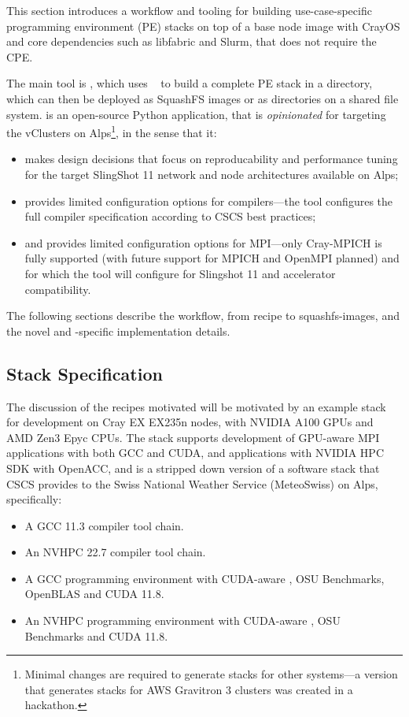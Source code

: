 This section introduces a workflow and tooling for building use-case-specific programming environment (PE) stacks on top of a base node image with CrayOS and core dependencies such as libfabric and Slurm, that does not require the CPE.

The main tool is \href{https://github.com/eth-cscs/stackinator}{\stackinator}, which uses \spack~\cite{gamblin:sc15} to build a complete PE stack in a directory, which can then be deployed as SquashFS images or as directories on a shared file system.
\stackinator is an open-source Python application, that is \emph{opinionated} for targeting the vClusters on Alps\footnote{Minimal changes are required to generate stacks for other systems---a version that generates stacks for AWS Gravitron 3 clusters was created in a hackathon.}, in the sense that it:
\begin{itemize}
    \item makes design decisions that focus on reproducability and performance tuning for the target SlingShot 11 network and node architectures available on Alps;
    \item provides limited configuration options for compilers---the tool configures the full compiler specification according to CSCS best practices;
    \item and provides limited configuration options for MPI---only Cray-MPICH is fully supported (with future support for MPICH and OpenMPI planned) and for which the tool will configure for Slingshot 11 and accelerator compatibility.
\end{itemize}

The following sections describe the workflow, from recipe to squashfs-images, and the novel and \crayex-specific implementation details.

\subsection{Stack Specification}

The discussion of the \spack recipes motivated will be motivated by an example stack for development on Cray EX EX235n nodes, with NVIDIA A100 GPUs and AMD Zen3 Epyc CPUs.
The stack supports development of GPU-aware MPI applications with both GCC and CUDA, and applications with NVIDIA HPC SDK with OpenACC, and is a stripped down version of a software stack that CSCS provides to the Swiss National Weather Service (MeteoSwiss) on Alps, specifically:
\begin{itemize}
    \item A GCC 11.3 compiler tool chain.
    \item An NVHPC 22.7 compiler tool chain.
    \item A GCC programming environment  with CUDA-aware \craympich, OSU Benchmarks, OpenBLAS and CUDA 11.8.
    \item An NVHPC programming environment  with CUDA-aware \craympich, OSU Benchmarks and CUDA 11.8.
\end{itemize}

